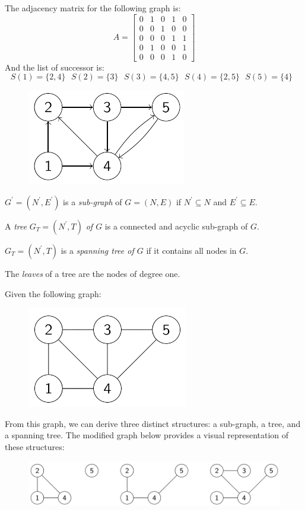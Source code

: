 \documentclass[12pt, a4paper]{report}
\begin{document}
    \begin{example}
        The adjacency matrix for the following graph is: 
        \[A=
        \begin{bmatrix}
            0 & 1 & 0 & 1 & 0 \\
            0 & 0 & 1 & 0 & 0 \\
            0 & 0 & 0 & 1 & 1 \\
            0 & 1 & 0 & 0 & 1 \\
            0 & 0 & 0 & 1 & 0 
            \end{bmatrix}
        \]
        And the list of successor is: 
        \[S(1)=\{2,4\} \:\:\: S(2)=\{3\} \:\:\:S(3)=\{4,5\} \:\:\: S(4)=\{2,5\} \:\:\: S(5)=\{4\} \:\:\:\]
        \begin{figure}[H]
            \centering
            \includegraphics[width=0.3\linewidth]{images/graphs.png}
        \end{figure}
    \end{example}
    \begin{definition}
        $G^{'}=(N^{'},E^{'})$ is a \emph{sub-graph} of $G=(N,E)$ if $N^{'} \subseteq N$ and $E^{'} \subseteq E$. 

        A \emph{tree} $G_T=(N^{'},T)$ \emph{of $G$} is a connected and acyclic sub-graph of $G$. 

        $G_T=(N^{'},T)$ is a \emph{spanning tree of $G$} if it contains all nodes in $G$. 

        The \emph{leaves} of a tree are the nodes of degree one. 
    \end{definition}
    \begin{example}
        Given the following graph: 
        \begin{figure}[H]
            \centering
            \includegraphics[width=0.3\linewidth]{images/sgraph.png}
        \end{figure}
        From this graph, we can derive three distinct structures: a sub-graph, a tree, and a spanning tree.
        The modified graph below provides a visual representation of these structures:
        \begin{figure}[H]
            \centering
            \includegraphics[width=0.8\linewidth]{images/sgraphmod.png}
        \end{figure}
    \end{example}
\end{document}
